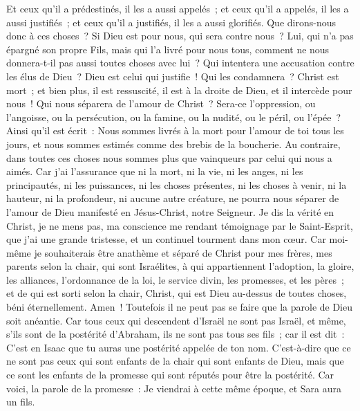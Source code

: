 \begin{multicols}{2}
Et ceux qu'il a prédestinés, il les a aussi appelés~; et ceux qu'il a appelés, il les a aussi justifiés~; et ceux qu'il a justifiés, il les a aussi glorifiés.
Que dirons-nous donc à ces choses~? Si Dieu est pour nous, qui sera contre nous~?
Lui, qui n'a pas épargné son propre Fils, mais qui l'a livré pour nous tous, comment ne nous donnera-t-il pas aussi toutes choses avec lui~?
Qui intentera une accusation contre les élus de Dieu~? Dieu est celui qui justifie~!
Qui les condamnera~? Christ est mort~; et bien plus, il est ressuscité, il est à la droite de Dieu, et il intercède pour nous~!
Qui nous séparera de l'amour de Christ~? Sera-ce l'oppression, ou l'angoisse, ou la persécution, ou la famine, ou la nudité, ou le péril, ou l'épée~?
Ainsi qu'il est écrit~: Nous sommes livrés à la mort pour l'amour de toi tous les jours, et nous sommes estimés comme des brebis de la boucherie.
Au contraire, dans toutes ces choses nous sommes plus que vainqueurs par celui qui nous a aimés.
Car j'ai l'assurance que ni la mort, ni la vie, ni les anges, ni les principautés, ni les puissances, ni les choses présentes, ni les choses à venir,
ni la hauteur, ni la profondeur, ni aucune autre créature, ne pourra nous séparer de l'amour de Dieu manifesté en Jésus-Christ, notre Seigneur.
\VerseOne{}Je dis la vérité en Christ, je ne mens pas, ma conscience me rendant témoignage par le Saint-Esprit,
que j'ai une grande tristesse, et un continuel tourment dans mon cœur.
Car moi-même je souhaiterais être anathème et séparé de Christ pour mes frères, mes parents selon la chair,
qui sont Israélites, à qui appartiennent l'adoption, la gloire, les alliances, l'ordonnance de la loi, le service divin,
les promesses, et les pères~; et de qui est sorti selon la chair, Christ, qui est Dieu au-dessus de toutes choses, béni éternellement. Amen~!
Toutefois il ne peut pas se faire que la parole de Dieu soit anéantie. Car tous ceux qui descendent d'Israël ne sont pas Israël,
et même, s'ils sont de la postérité d'Abraham, ils ne sont pas tous ses fils~; car il est dit~: C'est en Isaac que tu auras une postérité appelée de ton nom.
C'est-à-dire que ce ne sont pas ceux qui sont enfants de la chair qui sont enfants de Dieu, mais que ce sont les enfants de la promesse qui sont réputés pour être la postérité.
Car voici, la parole de la promesse~: Je viendrai à cette même époque, et Sara aura un fils.

\end{multicols}
